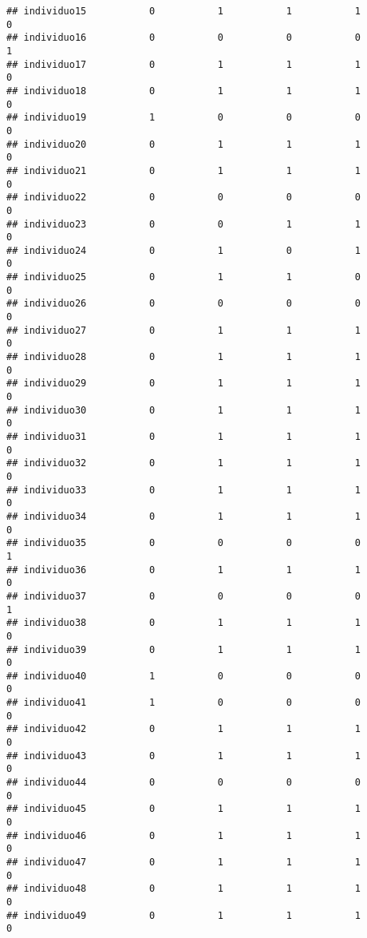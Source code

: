 \documentclass[
]{article}
\begin{document}
\begin{verbatim}
## individuo15           0           1           1           1           0
## individuo16           0           0           0           0           1
## individuo17           0           1           1           1           0
## individuo18           0           1           1           1           0
## individuo19           1           0           0           0           0
## individuo20           0           1           1           1           0
## individuo21           0           1           1           1           0
## individuo22           0           0           0           0           0
## individuo23           0           0           1           1           0
## individuo24           0           1           0           1           0
## individuo25           0           1           1           0           0
## individuo26           0           0           0           0           0
## individuo27           0           1           1           1           0
## individuo28           0           1           1           1           0
## individuo29           0           1           1           1           0
## individuo30           0           1           1           1           0
## individuo31           0           1           1           1           0
## individuo32           0           1           1           1           0
## individuo33           0           1           1           1           0
## individuo34           0           1           1           1           0
## individuo35           0           0           0           0           1
## individuo36           0           1           1           1           0
## individuo37           0           0           0           0           1
## individuo38           0           1           1           1           0
## individuo39           0           1           1           1           0
## individuo40           1           0           0           0           0
## individuo41           1           0           0           0           0
## individuo42           0           1           1           1           0
## individuo43           0           1           1           1           0
## individuo44           0           0           0           0           0
## individuo45           0           1           1           1           0
## individuo46           0           1           1           1           0
## individuo47           0           1           1           1           0
## individuo48           0           1           1           1           0
## individuo49           0           1           1           1           0

\end{verbatim}
\end{document}
